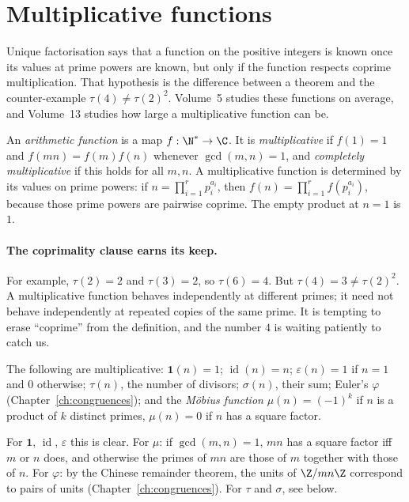 \section{Multiplicative functions}

Unique factorisation says that a function on the positive integers is known once its values at prime powers are known, but only if the function respects coprime multiplication. That hypothesis is the difference between a theorem and the counter-example $\tau(4)\ne\tau(2)^2$. Volume~5 studies these functions on average, and Volume~13 studies how large a multiplicative function can be.

An \emph{arithmetic function} is a map $f:\N^*\to\C$. It is \emph{multiplicative} if $f(1)=1$ and $f(mn)=f(m)f(n)$ whenever $\gcd(m,n)=1$, and \emph{completely multiplicative} if this holds for all $m,n$. A multiplicative function is determined by its values on prime powers:
if $n=\prod_{i=1}^r p_i^{a_i}$, then $f(n)=\prod_{i=1}^r f(p_i^{a_i})$,
because those prime powers are pairwise coprime. The empty product at $n=1$
is $1$.

\paragraph{The coprimality clause earns its keep.}
For example, $\tau(2)=2$ and $\tau(3)=2$, so $\tau(6)=4$. But
$\tau(4)=3\ne\tau(2)^2$. A multiplicative function behaves independently at
different primes; it need not behave independently at repeated copies of the
same prime. It is tempting to erase ``coprime'' from the definition, and the
number $4$ is waiting patiently to catch us.

\begin{example}
The following are multiplicative:
$\mathbf 1(n)=1$; $\operatorname{id}(n)=n$; $\varepsilon(n)=1$ if $n=1$ and $0$ otherwise;
$\tau(n)$, the number of divisors; $\sigma(n)$, their sum; Euler's $\varphi$ (Chapter~\ref{ch:congruences});
and the \emph{M\"obius function} $\mu(n)=(-1)^k$ if $n$ is a product of $k$ distinct primes, $\mu(n)=0$ if $n$ has a square factor.
\end{example}
For $\mathbf 1$, $\operatorname{id}$, $\varepsilon$ this is clear. For $\mu$: if $\gcd(m,n)=1$, $mn$ has a square factor iff $m$ or $n$ does, and otherwise the primes of $mn$ are those of $m$ together with those of $n$. For $\varphi$: by the Chinese remainder theorem, the units of $\Z/mn\Z$ correspond to pairs of units (Chapter~\ref{ch:congruences}). For $\tau$ and $\sigma$, see below.

